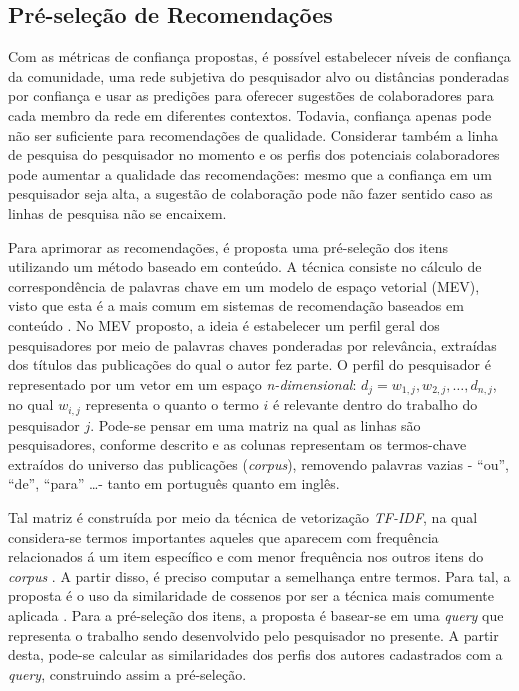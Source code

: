 \documentclass[12pt]{article}
\begin{document}
\subsection{Pré-seleção de Recomendações} \label{sect:pre-selection}

Com as métricas de confiança propostas, é possível estabelecer níveis de confiança da comunidade, uma rede subjetiva do pesquisador alvo ou distâncias ponderadas por confiança e usar as predições para oferecer sugestões de colaboradores para cada membro da rede em diferentes contextos. Todavia, confiança apenas pode não ser suficiente para recomendações de qualidade. Considerar também a linha de pesquisa do pesquisador no momento e os perfis dos potenciais colaboradores pode aumentar a qualidade das recomendações: mesmo que a confiança em um pesquisador seja alta, a sugestão de colaboração pode não fazer sentido caso as linhas de pesquisa não se encaixem. 

Para aprimorar as recomendações, é proposta uma pré-seleção dos itens utilizando um método baseado em conteúdo. A técnica consiste no cálculo de correspondência de palavras chave em um modelo de espaço vetorial (MEV), visto que esta é a mais comum em sistemas de recomendação baseados em conteúdo \cite{ricci2011introduction}. No MEV proposto, a ideia é estabelecer um perfil geral dos pesquisadores por meio de palavras chaves ponderadas por relevância, extraídas dos títulos das publicações do qual o autor fez parte. O perfil do pesquisador é representado por um vetor em um espaço \textit{n-dimensional}: $d_j = {w_{1,j}, w_{2,j}, \dots ,d_{n,j}}$, no qual $w_{i,j}$ representa o quanto o termo $i$ é relevante dentro do trabalho do pesquisador $j$. Pode-se pensar em uma matriz na qual as linhas são pesquisadores, conforme descrito e as colunas representam os termos-chave extraídos do universo das publicações (\textit{corpus}), removendo palavras vazias - “ou”, “de”, “para” \dots - tanto em português quanto em inglês.

Tal matriz é construída por meio da técnica de vetorização \textit{TF-IDF}, na qual considera-se termos importantes aqueles que aparecem com frequência relacionados á um item específico e com menor frequência nos outros itens do \textit{corpus} \cite{pazzani2007content}. A partir disso, é preciso computar a semelhança entre termos. Para tal, a proposta é o uso da similaridade de cossenos por ser a técnica mais comumente aplicada \cite{ricci2011introduction}. Para a pré-seleção dos itens, a proposta é basear-se em uma \textit{query} que representa o trabalho sendo desenvolvido pelo pesquisador no presente. A partir desta, pode-se calcular as similaridades dos perfis dos autores cadastrados com a \textit{query}, construindo assim a pré-seleção.
\end{document}
